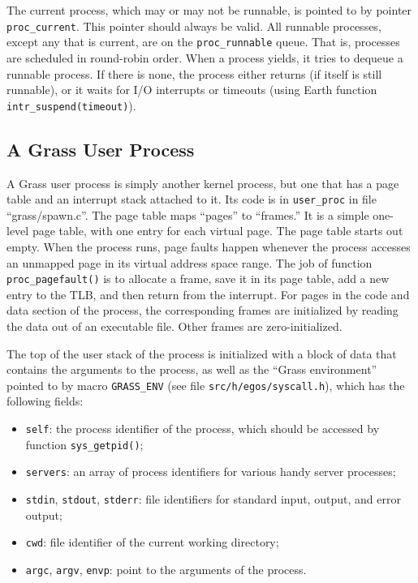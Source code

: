 \documentclass{article}
\begin{document}
The current process, which may or may not be runnable, is pointed to by
pointer \texttt{proc\_current}.  This pointer should always be valid.
All runnable processes, except any that is current, are
on the \texttt{proc\_runnable} queue.  That is, processes are scheduled
in round-robin order.
When a process yields, it tries to dequeue a runnable process.  If there
is none, the process either returns (if itself is still runnable), or
it waits for I/O interrupts or timeouts
(using Earth function \texttt{intr\_suspend(timeout)}).

\subsection{A Grass User Process}

A Grass user process is simply another kernel process, but one that
has a page table and an interrupt stack attached to it.
Its code is in \texttt{user\_proc} in file ``grass/spawn.c''.
The page table maps ``pages'' to ``frames.''  It is a simple one-level
page table, with one entry for each virtual page.  The page table
starts out empty.  When the process runs, page faults happen whenever
the process accesses an unmapped page in its virtual address space
range.  The job of function \texttt{proc\_pagefault()} is to allocate
a frame, save it in its page table, add a new entry to the TLB, and
then return from the interrupt.  For pages in the code and data section
of the process, the corresponding frames are initialized by reading
the data out of an executable file.  Other frames are zero-initialized.

The top of the user stack of the process is initialized with a block
of data that contains the arguments to the process, as well as the
``Grass environment'' pointed to by macro \texttt{GRASS\_ENV}
(see file \texttt{src/h/egos/syscall.h}), which has the following fields:

\begin{itemize}
\item \texttt{self}: the process identifier of the process, which should
be accessed by function \texttt{sys\_getpid()};
\item \texttt{servers}: an array of process
identifiers for various handy server processes;
\item \texttt{stdin}, \texttt{stdout}, \texttt{stderr}: file identifiers
for standard input, output, and error output;
\item \texttt{cwd}: file identifier of the current working directory;
\item \texttt{argc}, \texttt{argv}, \texttt{envp}: point to the arguments
of the process.
\end{itemize}
\end{document}
